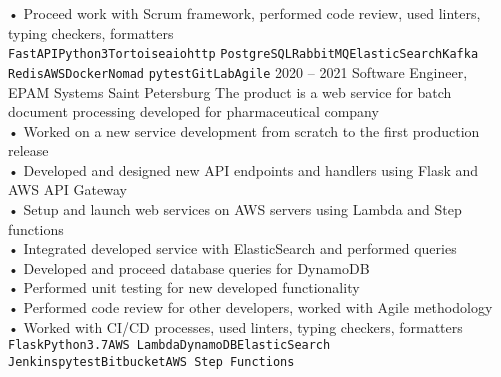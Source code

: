 {\begin{entrylist}
{            • Proceed work with Scrum framework, performed code review, used linters, typing checkers, formatters \\
			\texttt{FastAPI}\slashsep\texttt{Python3}\slashsep\texttt{Tortoise}\slashsep\texttt{aiohttp}\slashsep
			\texttt{PostgreSQL}\slashsep\texttt{RabbitMQ}\slashsep\texttt{ElasticSearch}\slashsep\texttt{Kafka}\\
			\texttt{Redis}\slashsep\texttt{AWS}\slashsep\texttt{Docker}\slashsep\texttt{Nomad}\slashsep
			\texttt{pytest}\slashsep\texttt{GitLab}\slashsep\texttt{Agile}
		}
		\entry
		{2020 – 2021}
		{Software Engineer, EPAM Systems}
		{Saint Petersburg}
		{
		    The product is a web service for batch document processing developed for pharmaceutical company \\
			• Worked on a new service development from scratch to the first production release \\
            • Developed and designed new API endpoints and handlers using Flask and AWS API Gateway \\
            • Setup and launch web services on AWS servers using Lambda and Step functions \\
            • Integrated developed service with ElasticSearch and performed queries \\
            • Developed and proceed database queries for DynamoDB \\
            • Performed unit testing for new developed functionality \\
            • Performed code review for other developers, worked with Agile methodology \\
            • Worked with CI/CD processes, used linters, typing checkers, formatters \\
			\texttt{Flask}\slashsep\texttt{Python3.7}\slashsep\texttt{AWS Lambda}\slashsep\texttt{DynamoDB}\slashsep\texttt{ElasticSearch}\\
			\texttt{Jenkins}\slashsep\texttt{pytest}\slashsep\texttt{Bitbucket}\slashsep\texttt{AWS Step Functions}
		}
	\end{entrylist}
}

\newcommand{\cvtemplateeducation}{Education}
\newcommand{\cveducation}{
	\begin{entrylist}
	    \entry
		{2018}
		{Python course, EPAM Systems}
		{Saint Petersburg}
		{
			Generally I studied Python on EPAM courses. During course, all main Python topics have been learnt
			and put into practice. My final project was written on Python, Flask.
			It was a web service for getting some statistics from external API and displaying it in graphs view.\\
			\texttt{Python3}\slashsep\texttt{Flask}
		}
		\entry
		{2014 – 2020}
		{Bachelor/Master's Degrees in Software Engineering, ITMO University}
		{Saint Petersburg}
		{
			I studied Software Engineering in University. My final project was written on Python, Django.
			It was a web service for saving educational results [certificates] based on Blockchain technology.\\
			\texttt{Python3}\slashsep\texttt{Django}\slashsep\texttt{SQLite}
		}
	\end{entrylist}
}

